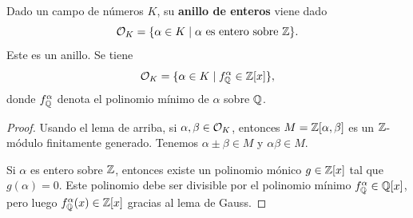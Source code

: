 \begin{proposicion-definicion}
  Dado un campo de números $K$, su \textbf{anillo de enteros} viene dado
  $$\mathcal{O}_K = \{ \alpha \in K \mid \alpha\text{ es entero sobre }\mathbb{Z} \}.$$
  Este es un anillo. Se tiene
  $$\mathcal{O}_K = \{ \alpha \in K \mid f_{\mathbb{Q}}^\alpha \in \mathbb{Z} [x] \},$$
  donde $f_{\mathbb{Q}}^\alpha$ denota el polinomio mínimo de $\alpha$ sobre $\mathbb{Q}$.

  \begin{proof}
    Usando el lema de arriba, si $\alpha,\beta \in \mathcal{O}_K$, entonces
    $M = \mathbb{Z} [\alpha,\beta]$ es un $\mathbb{Z}$-módulo finitamente generado. Tenemos
    $\alpha\pm\beta \in M$ y $\alpha\beta \in M$.

    Si $\alpha$ es entero sobre $\mathbb{Z}$, entonces existe un polinomio mónico
    $g \in \mathbb{Z} [x]$ tal que $g (\alpha) = 0$. Este polinomio debe ser
    divisible por el polinomio mínimo $f_{\mathbb{Q}}^\alpha \in \mathbb{Q} [x]$, pero luego
    $f_{\mathbb{Q}}^\alpha (x) \in \mathbb{Z} [x]$ gracias al lema de Gauss.
  \end{proof}
\end{proposicion-definicion}

